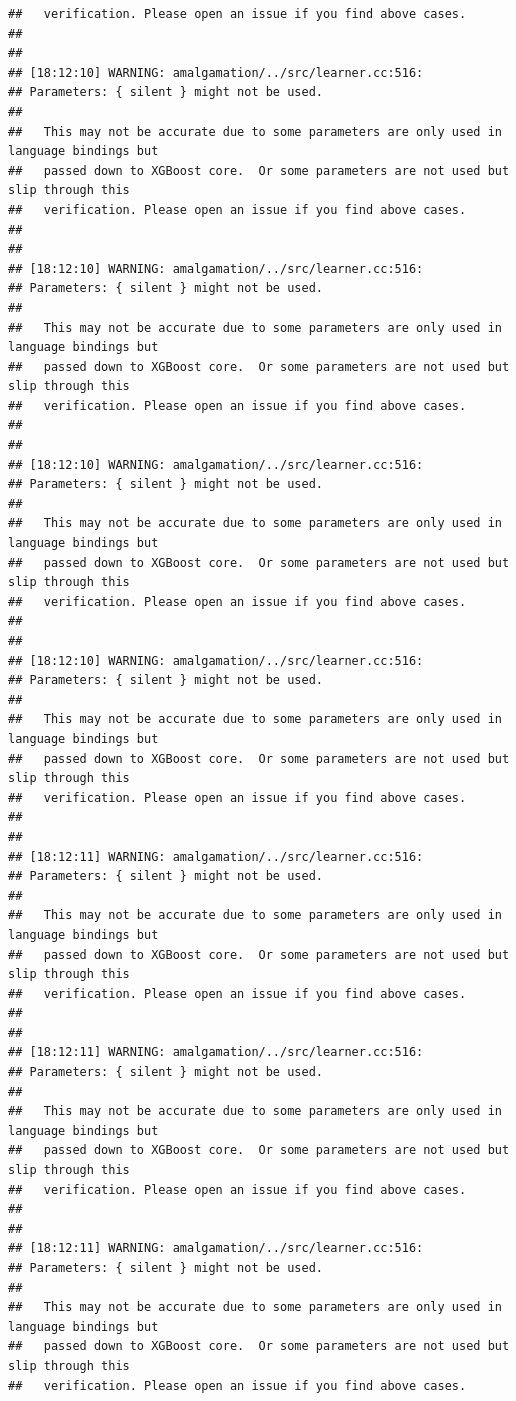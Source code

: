 \documentclass[AMS,STIX2COL]{WileyNJD-v2}\usepackage[]{graphicx}\usepackage[]{color}
\makeatletter
\newenvironment{kframe}{%
 \def\at@end@of@kframe{}%
 \ifinner\ifhmode%
  \def\at@end@of@kframe{\end{minipage}}%
  \begin{minipage}{\columnwidth}%
 \fi\fi%
 \def\FrameCommand##1{\hskip\@totalleftmargin \hskip-\fboxsep
 \colorbox{shadecolor}{##1}\hskip-\fboxsep
     \hskip-\linewidth \hskip-\@totalleftmargin \hskip\columnwidth}%
 \MakeFramed {\advance\hsize-\width
   \@totalleftmargin\z@ \linewidth\hsize
   \@setminipage}}%
 {\par\unskip\endMakeFramed%
 \at@end@of@kframe}
\newenvironment{knitrout}{}{} %
\makeatother
\begin{document}
\begin{knitrout}
\begin{kframe}
\begin{verbatim}
##   verification. Please open an issue if you find above cases.
## 
## 
## [18:12:10] WARNING: amalgamation/../src/learner.cc:516: 
## Parameters: { silent } might not be used.
## 
##   This may not be accurate due to some parameters are only used in language bindings but
##   passed down to XGBoost core.  Or some parameters are not used but slip through this
##   verification. Please open an issue if you find above cases.
## 
## 
## [18:12:10] WARNING: amalgamation/../src/learner.cc:516: 
## Parameters: { silent } might not be used.
## 
##   This may not be accurate due to some parameters are only used in language bindings but
##   passed down to XGBoost core.  Or some parameters are not used but slip through this
##   verification. Please open an issue if you find above cases.
## 
## 
## [18:12:10] WARNING: amalgamation/../src/learner.cc:516: 
## Parameters: { silent } might not be used.
## 
##   This may not be accurate due to some parameters are only used in language bindings but
##   passed down to XGBoost core.  Or some parameters are not used but slip through this
##   verification. Please open an issue if you find above cases.
## 
## 
## [18:12:10] WARNING: amalgamation/../src/learner.cc:516: 
## Parameters: { silent } might not be used.
## 
##   This may not be accurate due to some parameters are only used in language bindings but
##   passed down to XGBoost core.  Or some parameters are not used but slip through this
##   verification. Please open an issue if you find above cases.
## 
## 
## [18:12:11] WARNING: amalgamation/../src/learner.cc:516: 
## Parameters: { silent } might not be used.
## 
##   This may not be accurate due to some parameters are only used in language bindings but
##   passed down to XGBoost core.  Or some parameters are not used but slip through this
##   verification. Please open an issue if you find above cases.
## 
## 
## [18:12:11] WARNING: amalgamation/../src/learner.cc:516: 
## Parameters: { silent } might not be used.
## 
##   This may not be accurate due to some parameters are only used in language bindings but
##   passed down to XGBoost core.  Or some parameters are not used but slip through this
##   verification. Please open an issue if you find above cases.
## 
## 
## [18:12:11] WARNING: amalgamation/../src/learner.cc:516: 
## Parameters: { silent } might not be used.
## 
##   This may not be accurate due to some parameters are only used in language bindings but
##   passed down to XGBoost core.  Or some parameters are not used but slip through this
##   verification. Please open an issue if you find above cases.

\end{verbatim}
\end{kframe}
\end{knitrout}
\end{document}
